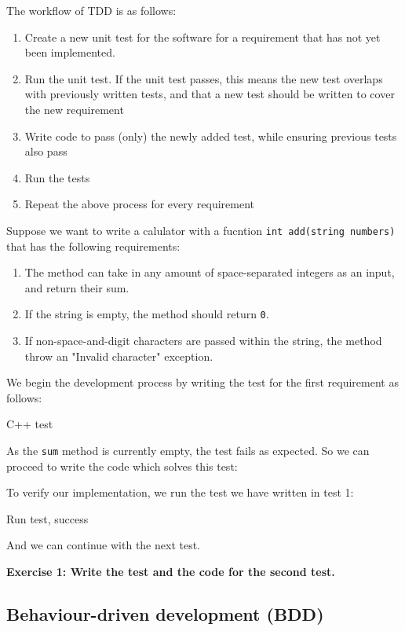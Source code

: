The workflow of TDD is as follows:

\begin{enumerate}
	\item Create a new unit test for the software for a requirement that has not yet been implemented. 
	\item Run the unit test. If the unit test passes, this means the new test overlaps with previously written tests, and that a new test should be written to cover the new requirement
	\item Write code to pass (only) the newly added test, while ensuring previous tests also pass
	\item Run the tests
	\item Repeat the above process for every requirement
\end{enumerate}

Suppose we want to write a calulator with a fucntion \texttt{int add(string numbers)} that has the following requirements:

\begin{enumerate}
	\item The method can take in any amount of space-separated integers as an input, and return their sum.
	\item If the string is empty, the method should return \texttt{0}.
	\item If non-space-and-digit characters are passed within the string, the method throw an "Invalid character" exception. 
\end{enumerate}

We begin the development process by writing the test for the first requirement as follows:

\rem C++ test

As the \texttt{sum} method is currently empty, the test fails as expected. So we can proceed to write the code which solves this test:


To verify our implementation, we run the test we have written in test 1:

\rem Run test, success

And we can continue with the next test. 

\textbf{Exercise 1: Write the test and the code for the second test.}

\subsection{Behaviour-driven development (BDD)}


